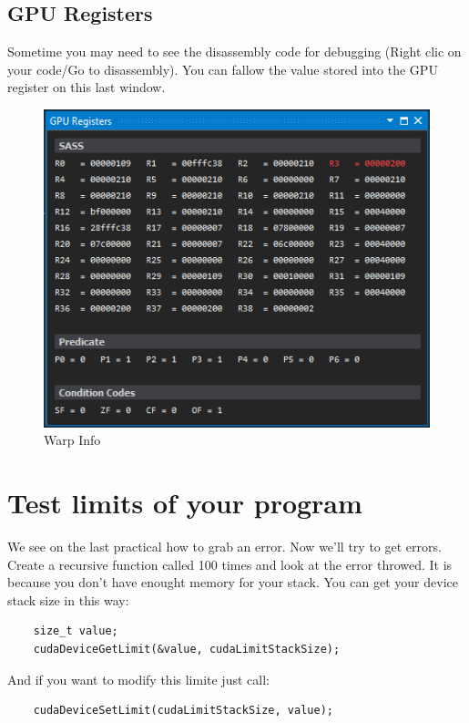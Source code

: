 \documentclass{article}
\begin{document}
\newpage
\subsection{GPU Registers}
Sometime you may need to see the disassembly code for debugging (Right clic on your code/Go to disassembly). You can fallow the value stored into the GPU register on this last window.

\begin{figure}[h]
	\centering
	\includegraphics[scale=0.6]{figures/register.png}
	\caption{Warp Info}
\end{figure}

\newpage
\section{Test limits of your program}
We see on the last practical how to grab an error. Now we'll try to get errors. Create a recursive function called 100 times and look at the error throwed. It is because you don't have enought memory for your stack. You can get your device stack size in this way:
\begin{lstlisting}
	size_t value;
	cudaDeviceGetLimit(&value, cudaLimitStackSize);
\end{lstlisting}
And if you want to modify this limite just call:
\begin{lstlisting}
	cudaDeviceSetLimit(cudaLimitStackSize, value);
\end{lstlisting}
\end{document}
